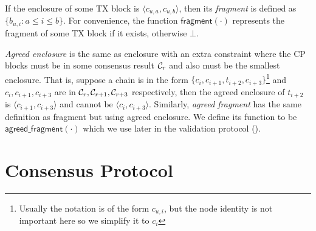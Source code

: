 If the enclosure of some TX block is $\langle c_{u,a}, c_{u, b} \rangle$,
then its \emph{fragment} is defined as $\{ b_{u, i} : a \le i \le b \}$.
For convenience, the function $\textsf{fragment}(\cdot)$ represents the fragment of some TX block if it exists, otherwise $\bot$.

\emph{Agreed enclosure} is the same as enclosure with an extra constraint where the CP blocks must be in some consensus result $\mathcal{C}_r$ and also must be the smallest enclosure.
That is, suppose a chain is in the form
    $\{c_{i}, c_{i+1}, t_{i+2}, c_{i+3}\}$\footnote{Usually the notation is of the form $c_{u, i}$, but the node identity is not important here so we simplify it to $c_{i}$}
    and $c_{i}, c_{i+1}, c_{i+3}$ are in $\mathcal{C}_r, \mathcal{C}_{r+1}, \mathcal{C}_{r+3}$ respectively,
    then the agreed enclosure of $t_{i+2}$ is $\langle c_{i+1}, c_{i+3}\rangle$ and cannot be $\langle c_{i}, c_{i+3}\rangle$.
Similarly, \emph{agreed fragment} has the same definition as fragment but using agreed enclosure.
We define its function to be $\textsf{agreed\_fragment}(\cdot)$ which we use later in the validation protocol ().



\section{Consensus Protocol}
\label{sec:cons-protocol}


